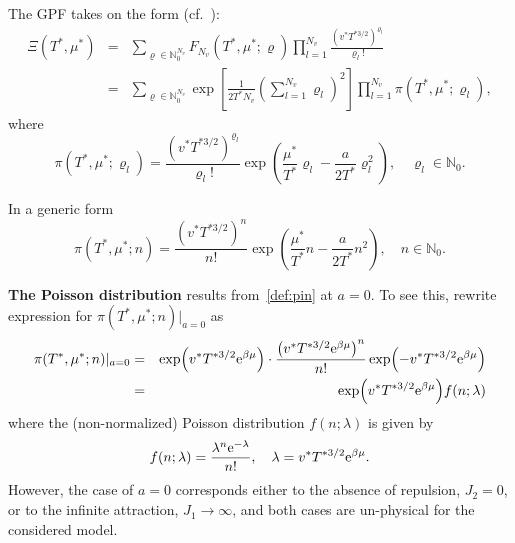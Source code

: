 \documentclass[12pt]{article}
\numberwithin{equation}{section}
\begin{document}
	The GPF takes on the form (cf.~\cite[2.11]{KKD20}):
	\begin{eqnarray}
		\label{eq:XiPi}
		\Xi(T^*,\mu^*) & = & \sum_{\varrho \in \mathbb{N}_0^{N_v}} F_{N_v}(T^*, \mu^*; \varrho) \prod\limits_{l=1}^{N_v} \frac{(v^* T^{*3/2})^{\varrho_l}}{\varrho_l !}
		\nonumber\\
		& = & \sum_{\varrho \in \mathbb{N}_0^{N_v}} \exp[\frac{1}{2 T^* N_v} \left(\sum_{l=1}^{N_v} \varrho_l\right)^2] \prod\limits_{l=1}^{N_v} \pi(T^*,\mu^*; \varrho_l),
	\end{eqnarray}
	where
	\begin{equation}
		\label{def:pirho}
		\pi(T^*, \mu^*; \varrho_l) = \frac{(v^* T^{*3/2})^{\varrho_l}}{\varrho_l !} \exp(\frac{\mu^*}{T^*}\varrho_l - \frac{a}{2T^*}\varrho_l^2), \quad \varrho_l \in \mathbb{N}_0.
	\end{equation}
	\begin{mdframed}[linecolor=black,linewidth=1pt,leftline=true]
		In a generic form
		\begin{equation}
			\label{def:pin}
			\pi(T^*, \mu^*; n) = \frac{\left(v^* T^{*3/2}\right)^n}{n!} \exp(\frac{\mu^*}{T^*} n - \frac{a}{2T^*}n^2), \quad n \in \mathbb{N}_0.
		\end{equation}
	\end{mdframed}
	
	\textbf{The Poisson distribution} results from~\eqref{def:pin} at $a=0$. To see this, rewrite expression for $\pi(T^*,\mu^*;n)|_{a=0}$ as
	\begin{eqnarray}
		\pi(T^*,\mu^*;n)|_{a=0} & = & \exp({v^* T^{*3/2} {\rm e}^{\beta\mu}}) \cdot
		\frac{\left(v^* T^{*3/2} {\rm e}^{\beta\mu}\right)^n}{n!} \exp({-v^* T^{*3/2} {\rm e}^{\beta\mu}}) 
		\nonumber\\
		& = & \exp({v^* T^{*3/2} {\rm e}^{\beta\mu}}) f(n; \lambda)
	\end{eqnarray}
	where the (non-normalized) Poisson distribution $f(n; \lambda)$ is given by
	\begin{equation}
		f(n; \lambda) = \frac{\lambda^n {\rm e}^{-\lambda}}{n!}, \quad \lambda = v^* T^{*3/2} {\rm e}^{\beta\mu}.
	\end{equation}
	However, the case of $a=0$ corresponds either to the absence of repulsion, $J_2=0$, or to the infinite attraction, $J_1 \to \infty$, and both cases are un-physical for the considered model.
	
\end{document}
